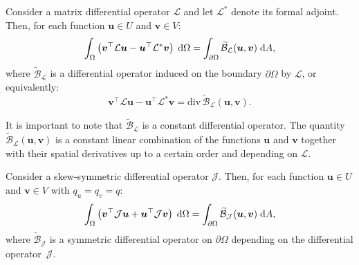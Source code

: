\begin{theorem}
	Consider a matrix differential operator $\mathcal{L}$ and let $\mathcal{L}^*$ denote its formal adjoint. Then, for each function $\bm{u} \in {U}$ and $\bm{v} \in {V}$:
	\begin{equation}
	\int_{\Omega} \left( \bm{v}^\top \mathcal{L} \bm{u} - \bm{u}^\top \mathcal{L}^* \bm{v}\right) \d\Omega= \int_{\partial \Omega} \widetilde{\mathcal{B}}_{\mathcal{L}}(\bm{u}, \bm{v}) \d{A},
	\end{equation}
	where $\widetilde{\mathcal{B}}_{\mathcal{L}}$ is a differential operator induced on the boundary $\partial\Omega$ by $\mathcal{L}$, or equivalently:
	\begin{equation}
	\bm{v}^\top \mathcal{L} \bm{u} - \bm{u}^\top \mathcal{L}^* \bm{v} = \mathrm{div} \, \widetilde{\mathcal{B}}_{\mathcal{L}}(\bm{u}, \bm{v}).
	\end{equation}
\end{theorem}
It is important to note that $\widetilde{\mathcal{B}}_{\mathcal{L}}$ is a constant differential operator. The quantity $\widetilde{\mathcal{B}}_{\mathcal{L}}(\bm{u}, \bm{v})$ is a constant linear combination of the functions $\bm{u}$ and $\bm{v}$ together with their spatial derivatives up to a certain order and depending on $\mathcal{L}$.
\begin{corollary}
	Consider a skew-symmetric differential operator $\mathcal{J}$. Then, for each function $\bm{u} \in {U}$ and $\bm{v} \in {V}$ with $q_u = q_v = q$:
	\begin{equation}
	\int_{\Omega} \left( \bm{v}^\top \mathcal{J} \bm{u} + \bm{u}^\top \mathcal{J} \bm{v}\right) \d\Omega= \int_{\partial \Omega} \widetilde{\mathcal{B}}_{\mathcal{J}}(\bm{u}, \bm{v}) \d{A},
	\end{equation}
	where $\widetilde{\mathcal{B}}_{\mathcal{J}}$ is a symmetric differential operator on $\partial\Omega$ depending on the differential operator~$\mathcal{J}$.
\end{corollary}

